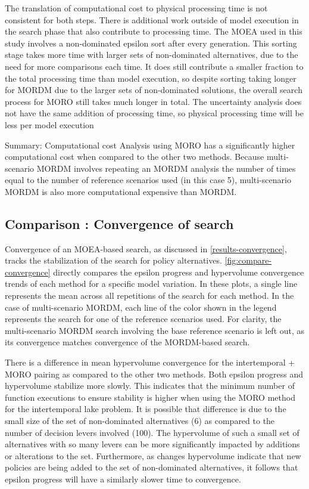     The translation of computational cost to physical processing time is not consistent for both steps. There is additional work outside of model execution in the search phase that also contribute to processing time. The MOEA used in this study involves a non-dominated epsilon sort after every generation. This sorting stage takes more time with larger sets of non-dominated alternatives, due to the need for more comparisons each time. It does still contribute a smaller fraction to the total processing time than model execution, so despite sorting taking longer for MORDM due to the larger sets of non-dominated solutions, the overall search process for MORO still takes much longer in total. The uncertainty analysis does not have the same addition of processing time, so physical processing time will be less per model execution
    
    \begin{comparisonbox}{Summary: Computational cost}
        Analysis using MORO has a significantly higher computational cost when compared to the other two methods. Because multi-scenario MORDM involves repeating an MORDM analysis the number of times equal to the number of reference scenarios used (in this case 5), multi-scenario MORDM is also more computational expensive than MORDM. 
    \end{comparisonbox}

    \subsection{Comparison \thecomparison : Convergence of search} 
    Convergence of an MOEA-based search, as discussed in \cref{results-convergence}, tracks the stabilization of the search for policy alternatives. \cref{fig:compare-convergence} directly compares the epsilon progress and hypervolume convergence trends of each method for a specific model variation. In these plots, a single line represents the mean across all repetitions of the search for each method. In the case of multi-scenario MORDM, each line of the color shown in the legend represents the search for one of the reference scenarios used. For clarity, the multi-scenario MORDM search involving the base reference scenario is left out, as its convergence matches convergence of the MORDM-based search.
    
    There is a difference in mean hypervolume convergence for the intertemporal + MORO pairing as compared to the other two methods. Both epsilon progress and hypervolume stabilize more slowly. This indicates that the minimum number of function executions to ensure stability is higher when using the MORO method for the intertemporal lake problem. It is possible that difference is due to the small size of the set of non-dominated alternatives (6) as compared to the number of decision levers involved (100). The hypervolume of such a small set of alternatives with so many levers can be more significantly impacted by additions or alterations to the set. Furthermore, as changes hypervolume indicate that new policies are being added to the set of non-dominated alternatives, it follows that epsilon progress will have a similarly slower time to convergence. 
    

